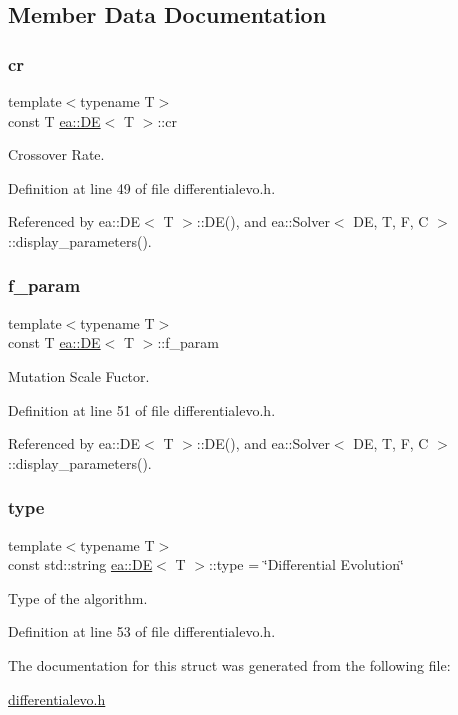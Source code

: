 \subsection{Member Data Documentation}
\mbox{\label{structea_1_1_d_e_adc00ae4bfe7fb6c2581e08ca47e753b2}} 
\subsubsection{\texorpdfstring{cr}{cr}}
{\footnotesize\ttfamily template$<$typename T$>$ \\
const T \hyperlink{structea_1_1_d_e}{ea\+::\+DE}$<$ T $>$\+::cr}



Crossover Rate. 



Definition at line 49 of file differentialevo.\+h.



Referenced by ea\+::\+D\+E$<$ T $>$\+::\+D\+E(), and ea\+::\+Solver$<$ D\+E, T, F, C $>$\+::display\+\_\+parameters().

\mbox{\label{structea_1_1_d_e_a6b798f4a095796b766b2452aacea8a6b}} 
\subsubsection{\texorpdfstring{f\+\_\+param}{f\_param}}
{\footnotesize\ttfamily template$<$typename T$>$ \\
const T \hyperlink{structea_1_1_d_e}{ea\+::\+DE}$<$ T $>$\+::f\+\_\+param}



Mutation Scale Fuctor. 



Definition at line 51 of file differentialevo.\+h.



Referenced by ea\+::\+D\+E$<$ T $>$\+::\+D\+E(), and ea\+::\+Solver$<$ D\+E, T, F, C $>$\+::display\+\_\+parameters().

\mbox{\label{structea_1_1_d_e_a0968311419d1919244af4415b294739a}} 
\subsubsection{\texorpdfstring{type}{type}}
{\footnotesize\ttfamily template$<$typename T$>$ \\
const std\+::string \hyperlink{structea_1_1_d_e}{ea\+::\+DE}$<$ T $>$\+::type = \char`\"{}Differential Evolution\char`\"{}}



Type of the algorithm. 



Definition at line 53 of file differentialevo.\+h.



The documentation for this struct was generated from the following file\+:\begin{DoxyCompactItemize}
\item 
\hyperlink{differentialevo_8h}{differentialevo.\+h}\end{DoxyCompactItemize}
